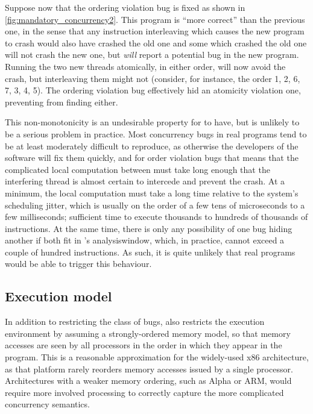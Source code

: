 Suppose now that the ordering violation bug is fixed as shown in
\autoref{fig:mandatory_concurrency2}.  This program is ``more
correct'' than the previous one, in the sense that any instruction
interleaving which causes the new program to crash would also have
crashed the old one and some which crashed the old one will not crash
the new one, but {\technique} \emph{will} report a potential bug in
the new program.  Running the two new threads atomically, in either
order, will now avoid the crash, but interleaving them might not
(consider, for instance, the order 1, 2, 6, 7, 3, 4, 5).  The ordering
violation bug effectively hid an atomicity violation one, preventing
{\technique} from finding either.

This non-monotonicity is an undesirable property for {\technique} to
have, but is unlikely to be a serious problem in practice.  Most
concurrency bugs in real programs tend to be at least moderately
difficult to reproduce, as otherwise the developers of the software
will fix them quickly, and for order violation bugs that means that
the complicated local computation between must take long enough that
the interfering thread is almost certain to intercede and prevent the
crash.  At a minimum, the local computation must take a long time
relative to the system's scheduling jitter, which is usually on the
order of a few tens of microseconds to a few milliseconds; sufficient
time to execute thousands to hundreds of thousands of instructions.
At the same time, there is only any possibility of one bug hiding
another if both fit in {\technique}'s \gls{analysiswindow}, which, in
practice, cannot exceed a couple of hundred instructions.  As such, it
is quite unlikely that real programs would be able to trigger this
behaviour.

\subsection{Execution model}

In addition to restricting the class of bugs, {\technique} also
restricts the execution environment by assuming a strongly-ordered
memory model, so that memory accesses are seen by all processors in
the order in which they appear in the program.  This is a reasonable
approximation for the widely-used x86 architecture\cite[Section
  8.2]{Intel2013}, as that platform rarely reorders memory accesses
issued by a single processor.  Architectures with a weaker memory
ordering, such as Alpha\cite[Section 5.6]{Compaq2002} or
ARM\cite[Section 5.3.4]{ARM2007}, would require more involved
processing to correctly capture the more complicated concurrency
semantics.

